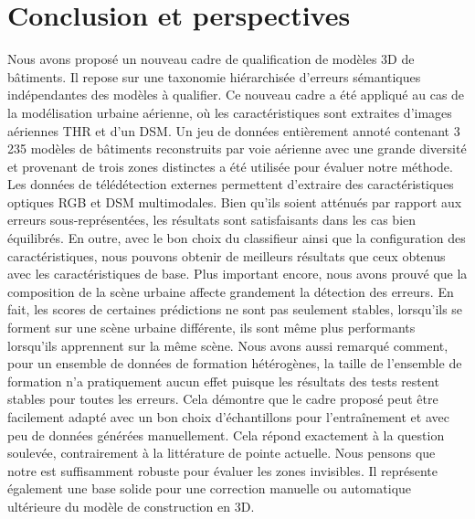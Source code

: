 \section*{Conclusion et perspectives}
    Nous avons proposé un nouveau cadre de qualification de modèles 3D de bâtiments.
    Il repose sur une taxonomie hiérarchisée d'erreurs sémantiques indépendantes des modèles à qualifier.
    Ce nouveau cadre a été appliqué au cas de la modélisation urbaine aérienne, où les caractéristiques sont extraites d'images aériennes THR et d'un DSM.
    Un jeu de données entièrement annoté contenant 3 235 modèles de bâtiments reconstruits par voie aérienne avec une grande diversité et provenant de trois zones distinctes a été utilisée pour évaluer notre méthode.
    Les données de télédétection externes permettent d'extraire des caractéristiques optiques RGB et DSM multimodales.
    Bien qu'ils soient atténués par rapport aux erreurs sous-représentées, les résultats sont satisfaisants dans les cas bien équilibrés.
    En outre, avec le bon choix du classifieur ainsi que la configuration des caractéristiques, nous pouvons obtenir de meilleurs résultats que ceux obtenus avec les caractéristiques de base.
    Plus important encore, nous avons prouvé que la composition de la scène urbaine affecte grandement la détection des erreurs.
    En fait, les scores de certaines prédictions ne sont pas seulement stables, lorsqu'ils se forment sur une scène urbaine différente, ils sont même plus performants lorsqu'ils apprennent sur la même scène.
    Nous avons aussi remarqué comment, pour un ensemble de données de formation hétérogènes, la taille de l'ensemble de formation n'a pratiquement aucun effet puisque les résultats des tests restent stables pour toutes les erreurs.
    Cela démontre que le cadre proposé peut être facilement adapté avec un bon choix d'échantillons pour l'entraînement et avec peu de données générées manuellement.
    Cela répond exactement à la question soulevée, contrairement à la littérature de pointe actuelle.
    Nous pensons que notre est suffisamment robuste pour évaluer les zones invisibles.
    Il représente également une base solide pour une correction manuelle ou automatique ultérieure du modèle de construction en 3D.

